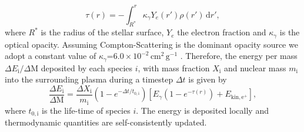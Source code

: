 \documentclass[fleqn,usenatbib]{mnras}
\newcommand{\ud}{\ensuremath{\mathrm{d}}\xspace}
\begin{document}
{\begin{equation}
    \tau(r) = -\int_{R^*}^{r} \kappa_{\gamma} Y_e(r') \rho(r')\, \ud r',
\end{equation}
where $R^*$ is the radius of the stellar surface, $Y_e$ the electron fraction and $\kappa_{\gamma}$ is the optical opacity. Assuming Compton-Scattering is the dominant opacity source we adopt a constant value of $\kappa_{\gamma}\mathord{=}6.0\,\mathord{\times}\, 10^{-2} \,\mathrm{cm^2\, g^{-1}}$ \cite{Swartz1995}.
Therefore, the energy per mass $\Delta E_{\mathrm{i}}/\Delta\mathrm{M}$ deposited by each species $i$, with mass fraction $X_{\mathrm{i}}$ and nuclear mass $m_{\mathrm{i}}$ into the surrounding plasma during a timestep $\Delta t$ is given by
\begin{equation}
        \frac{\Delta E_{\mathrm{i}}}{\Delta \mathrm{M}} =  \frac{\Delta X_{\mathrm{i}}}{m_{\mathrm{i}}}
       \left( 1 - e^{-\Delta t / t_{0,\mathrm{i}}} \right) 
        \left[ E_{\gamma} \left( 1 - e^{-\tau(r)} \right) + E_{\mathrm{kin,e^{+}}}\right],
\end{equation}
where $t_{0,\mathrm{i}}$ is the life-time of species $i$. The energy is deposited locally and thermodynamic quantities are self-consistently updated.}
 
\end{document}
